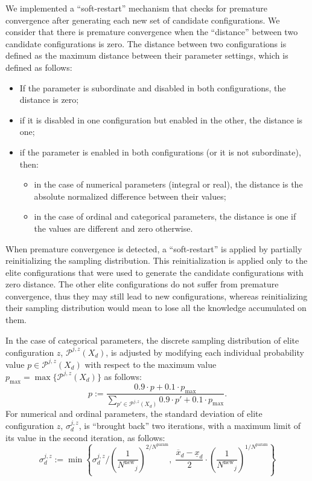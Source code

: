 \documentclass[article,a4paper,nojss,notitle]{jss}
\newcommand{\assign}{\ensuremath{:=}}
\newcommand{\iter}{\ensuremath{j}\xspace}
\newcommand{\Nparam}{\ensuremath{{N^\text{param}}}\xspace}
\newcommand{\Nnew}{\ensuremath{N^\text{new}}\xspace}
\newcommand{\parameter}[1]{\code{#1}}
\renewcommand{\enspace}{}
\begin{document}
We implemented a ``soft-restart'' mechanism that checks for premature
convergence after generating each new set of candidate configurations.  We consider that there is premature
convergence when the ``distance'' between two candidate
configurations is zero. The
distance between two configurations is defined as the maximum distance
between their parameter settings, which is defined as follows:

\begin{itemize}
\item If the parameter is subordinate and disabled in both configurations, the distance is zero;
\item if it is disabled in one configuration but enabled in the other,
  the distance is one;
\item if the parameter is enabled in both configurations (or it is not subordinate), then: 

  \begin{itemize}
  \item in the case of numerical parameters (integral or real), the
    distance is the absolute normalized difference between their
    values;

  \item in the case of ordinal and categorical parameters, the distance
    is one if the values are different and zero otherwise.
  \end{itemize}
\end{itemize}

When premature convergence is detected, a ``soft-restart'' is applied
by partially reinitializing the sampling distribution. This
reinitialization is applied only to the elite configurations that were
used to generate the candidate configurations with zero distance. The
other elite configurations do not suffer from premature convergence,
thus they may still lead to new configurations, whereas reinitializing
their sampling distribution would mean to lose all the knowledge
accumulated on them.

In the case of categorical parameters, the discrete sampling distribution
of elite configuration $z$, $\mathcal{P}^{\iter,z}(X_d)$, is adjusted
by modifying each individual probability value $p \in
\mathcal{P}^{\iter,z}(X_d)$ with respect to the maximum value
$p_\text{max} = \max\{\mathcal{P}^{\iter,z}(X_d)\}$ as follows:
%
\[p \assign \frac{0.9 \cdot p + 0.1 \cdot p_\text{max}}{\sum_{p' \in \mathcal{P}^{\iter,z}(X_d)} 0.9 \cdot p' + 0.1 \cdot p_\text{max}}\enspace.\]
%
For numerical and ordinal parameters, the standard deviation of elite configuration $z$, $\sigma_d^{\iter,z}$, is ``brought back'' two iterations, with a maximum limit of its value in the second iteration, as follows:
\[
  \sigma_d^{\iter,z} \assign \min\left\{ \sigma_d^{\iter,z} / \left(\frac{1}{\Nnew_{\iter}}\right)^{2/\Nparam},\;
\frac{\overline{x}_d
- \underline{x}_d}{2} \cdot \left(\frac{1}{\Nnew_{\iter}}\right)^{1/\Nparam}\right\}
\]
\end{document}
